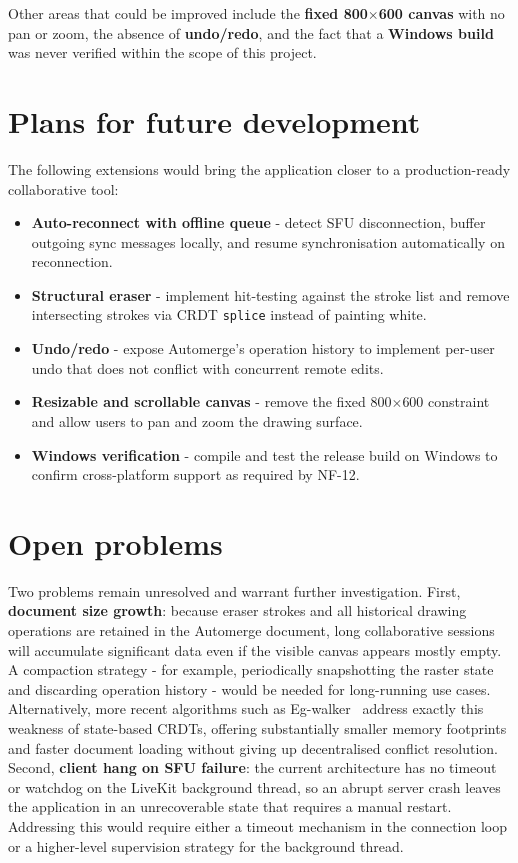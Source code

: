 \documentclass[a4paper,11pt,twoside]{report}
\theoremstyle{definition}
\begin{document}
Other areas that could be improved include the \textbf{fixed 800$\times$600 canvas} with
no pan or zoom, the absence of \textbf{undo/redo}, and the fact that a \textbf{Windows
build} was never verified within the scope of this project.

\section{Plans for future development}

The following extensions would bring the application closer to a production-ready
collaborative tool:

\begin{itemize}
    \item \textbf{Auto-reconnect with offline queue} - detect SFU disconnection, buffer
    outgoing sync messages locally, and resume synchronisation automatically on
    reconnection.
    \item \textbf{Structural eraser} - implement hit-testing against the stroke list and
    remove intersecting strokes via CRDT \texttt{splice} instead of painting white.
    \item \textbf{Undo/redo} - expose Automerge's operation history to implement
    per-user undo that does not conflict with concurrent remote edits.
    \item \textbf{Resizable and scrollable canvas} - remove the fixed 800$\times$600
    constraint and allow users to pan and zoom the drawing surface.
    \item \textbf{Windows verification} - compile and test the release build on Windows
    to confirm cross-platform support as required by NF-12.
\end{itemize}

\section{Open problems}

Two problems remain unresolved and warrant further investigation. First, \textbf{document
size growth}: because eraser strokes and all historical drawing operations are retained in
the Automerge document, long collaborative sessions will accumulate significant data even
if the visible canvas appears mostly empty. A compaction strategy - for example,
periodically snapshotting the raster state and discarding operation history - would be
needed for long-running use cases. Alternatively, more recent algorithms such as
Eg-walker~\cite{kleppmann-egwalker} address exactly this weakness of state-based CRDTs,
offering substantially smaller memory footprints and faster document loading without
giving up decentralised conflict resolution. Second, \textbf{client hang on SFU failure}: the
current architecture has no timeout or watchdog on the LiveKit background thread, so an
abrupt server crash leaves the application in an unrecoverable state that requires a
manual restart. Addressing this would require either a timeout mechanism in the connection
loop or a higher-level supervision strategy for the background thread.
\end{document}
